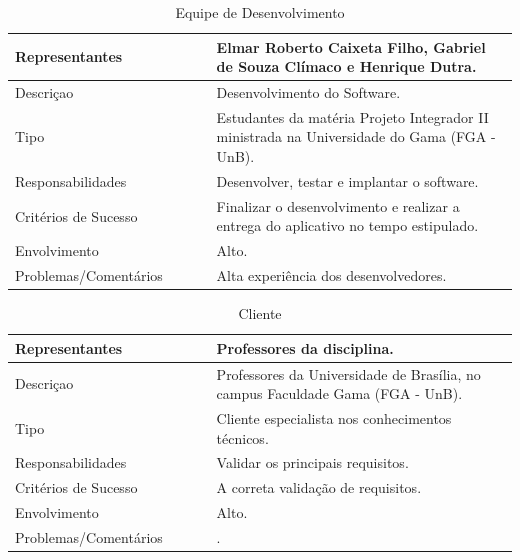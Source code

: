 \begin{apendicesenv}
\begin{table}[htp]
    \centering
    \caption{Equipe de Desenvolvimento}
    \label{my-label}
    \begin{tabular}{|p{0.40\linewidth}|p{0.60\linewidth}|}
        \hline
        Representantes    & Elmar Roberto Caixeta Filho, Gabriel de Souza Clímaco e Henrique Dutra. \\ \hline
        Descriçao    & Desenvolvimento do Software. \\ \hline
        Tipo    & Estudantes da matéria Projeto Integrador II ministrada na Universidade do Gama (FGA - UnB). \\ \hline
        Responsabilidades    & Desenvolver, testar e implantar o software. \\ \hline
        Critérios de Sucesso    & Finalizar o desenvolvimento e realizar a entrega do aplicativo no tempo estipulado. \\ \hline
        Envolvimento    & Alto. \\ \hline
        Problemas/Comentários    & Alta experiência dos desenvolvedores. \\ \hline
    \end{tabular}
\end{table}


\begin{table}[htp]
    \centering
    \caption{Cliente}
    \label{my-label}
    \begin{tabular}{|p{0.40\linewidth}|p{0.60\linewidth}|}
        \hline
        Representantes    & Professores da disciplina. \\ \hline
        Descriçao    & Professores da Universidade de Brasília, no campus Faculdade Gama (FGA - UnB). \\ \hline
        Tipo    &  Cliente especialista nos conhecimentos técnicos. \\ \hline
        Responsabilidades    & Validar os principais requisitos.  \\ \hline
        Critérios de Sucesso    & A correta validação de requisitos. \\ \hline
        Envolvimento    & Alto. \\ \hline
        Problemas/Comentários    & . \\ \hline
    \end{tabular}
\end{table}



\end{apendicesenv}
